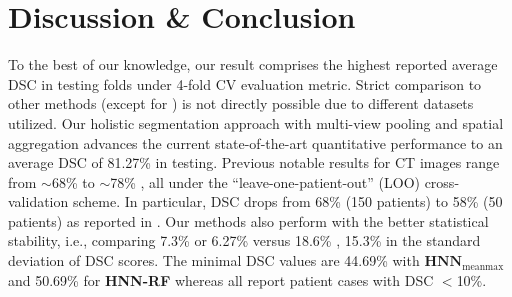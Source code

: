 \documentclass[journal]{IEEEtran}
\begin{document}
\section{Discussion \& Conclusion}\label{sec:discussion}
\noindent To the best of our knowledge, our result comprises the highest reported average DSC in testing folds under 4-fold CV evaluation metric. Strict comparison to other methods (except for \cite{roth2015deeporgan,roth2016spatial}) is not directly possible due to different datasets utilized. Our holistic segmentation approach with multi-view pooling and spatial aggregation advances the current state-of-the-art quantitative performance to an average DSC of 81.27\% in testing. Previous notable results for CT images range from $\sim$68\% to $\sim$78\% \cite{wolz2013automated,Chu2013Miccai,tong2015discriminative,okada2015abdominal,oda2016regression}, all under the ``leave-one-patient-out'' (LOO) cross-validation scheme. In particular, DSC drops from 68\% (150 patients) to 58\% (50 patients) as reported in \cite{wolz2013automated}. Our methods also perform with the better statistical stability, i.e., comparing 7.3\%  or 6.27\% versus 18.6\% \cite{Wang2014Miccai}, 15.3\% \cite{Chu2013Miccai} in the standard deviation of DSC scores. The minimal DSC values are 44.69\% with $\mathbf{HNN}_\mathrm{meanmax}$ and 50.69\% for \textbf{HNN-RF} whereas \cite{Wang2014Miccai,Chu2013Miccai,wolz2013automated,roth2015deeporgan} all report patient cases with DSC $<$10\%. 
\end{document}
